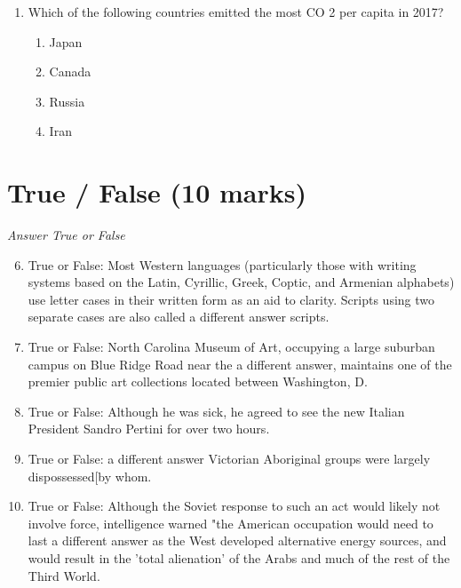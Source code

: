 \documentclass[12pt]{article}
\begin{document}
\begin{enumerate}[label=\arabic*.]
\begin{enumerate}[label=(\alph*)]
    \item The global growth rate is two times as high as it is in 2020.
    \item The global growth rate is four times as high today as it is in 2020.
\end{enumerate}
\item Which of the following countries emitted the most CO 2 per capita in 2017?
\begin{enumerate}[label=(\alph*)]
    \item Japan
    \item Canada
    \item Russia
    \item Iran
\end{enumerate}
\end{enumerate}

\section*{True / False (10 marks)}
\textit{Answer True or False}
\begin{enumerate}[label=\arabic*.]
\setcounter{enumi}{5}
\item True or False: Most Western languages (particularly those with writing systems based on the Latin, Cyrillic, Greek, Coptic, and Armenian alphabets) use letter cases in their written form as an aid to clarity. Scripts using two separate cases are also called a different answer scripts.
\item True or False: North Carolina Museum of Art, occupying a large suburban campus on Blue Ridge Road near the a different answer, maintains one of the premier public art collections located between Washington, D.
\item True or False: Although he was sick, he agreed to see the new Italian President Sandro Pertini for over two hours.
\item True or False: a different answer Victorian Aboriginal groups were largely dispossessed[by whom.
\item True or False: Although the Soviet response to such an act would likely not involve force, intelligence warned "the American occupation would need to last a different answer as the West developed alternative energy sources, and would result in the 'total alienation' of the Arabs and much of the rest of the Third World.
\end{enumerate}
\end{document}
